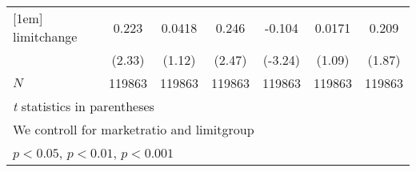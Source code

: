 {\begin{tabular}{l*{6}{c}}
[1em]
limitchange &       0.223\sym{*}  &      0.0418         &       0.246\sym{*}  &      -0.104\sym{**} &      0.0171         &       0.209         \\
            &      (2.33)         &      (1.12)         &      (2.47)         &     (-3.24)         &      (1.09)         &      (1.87)         \\
\hline
\(N\)       &      119863         &      119863         &      119863         &      119863         &      119863         &      119863         \\
\hline\hline
\multicolumn{7}{l}{\footnotesize \textit{t} statistics in parentheses}\\
\multicolumn{7}{l}{\footnotesize We controll for marketratio and limitgroup}\\
\multicolumn{7}{l}{\footnotesize \sym{*} \(p<0.05\), \sym{**} \(p<0.01\), \sym{***} \(p<0.001\)}\\
\end{tabular}
}
